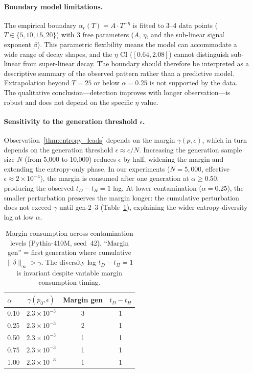 \paragraph{Boundary model limitations.}
The empirical boundary $\alpha_c(T) = A \cdot T^{-\eta}$ is fitted to 3--4 data points ($T \in \{5, 10, 15, 20\}$) with 3 free parameters ($A$, $\eta$, and the sub-linear signal exponent $\beta$).
This parametric flexibility means the model can accommodate a wide range of decay shapes, and the $\eta$ CI ($[0.64, 2.08]$) cannot distinguish sub-linear from super-linear decay.
The boundary should therefore be interpreted as a descriptive summary of the observed pattern rather than a predictive model.
Extrapolation beyond $T{=}25$ or below $\alpha{=}0.25$ is not supported by the data.
The qualitative conclusion---detection improves with longer observation---is robust and does not depend on the specific $\eta$ value.

\paragraph{Sensitivity to the generation threshold $\epsilon$.}
Observation~\ref{thm:entropy_leads} depends on the margin $\gamma(p, \epsilon)$, which in turn depends on the generation threshold $\epsilon \approx c/N$.
Increasing the generation sample size $N$ (from 5{,}000 to 10{,}000) reduces $\epsilon$ by half, widening the margin and extending the entropy-only phase.
In our experiments ($N{=}5{,}000$, effective $\epsilon \approx 2 \times 10^{-4}$), the margin is consumed after one generation at $\alpha{\geq}0.50$, producing the observed $t_D - t_H = 1$ lag.
At lower contamination ($\alpha{=}0.25$), the smaller perturbation preserves the margin longer: the cumulative perturbation does not exceed $\gamma$ until gen-2--3 (Table~\ref{tab:margin_consumption}), explaining the wider entropy-diversity lag at low $\alpha$.

\begin{table}[H]
\centering
\small
\caption{Margin consumption across contamination levels (Pythia-410M, seed~42). ``Margin gen'' = first generation where cumulative $\|\delta\|_\infty > \gamma$. The diversity lag $t_D - t_H{=}1$ is invariant despite variable margin consumption timing.}
\label{tab:margin_consumption}
\begin{tabular}{lccc}
\toprule
$\alpha$ & $\gamma(p_0, \epsilon)$ & Margin gen & $t_D - t_H$ \\
\midrule
0.10 & $2.3 \times 10^{-3}$ & 3 & 1 \\
0.25 & $2.3 \times 10^{-3}$ & 2 & 1 \\
0.50 & $2.3 \times 10^{-3}$ & 1 & 1 \\
0.75 & $2.3 \times 10^{-3}$ & 1 & 1 \\
1.00 & $2.3 \times 10^{-3}$ & 1 & 1 \\
\bottomrule
\end{tabular}
\end{table}

